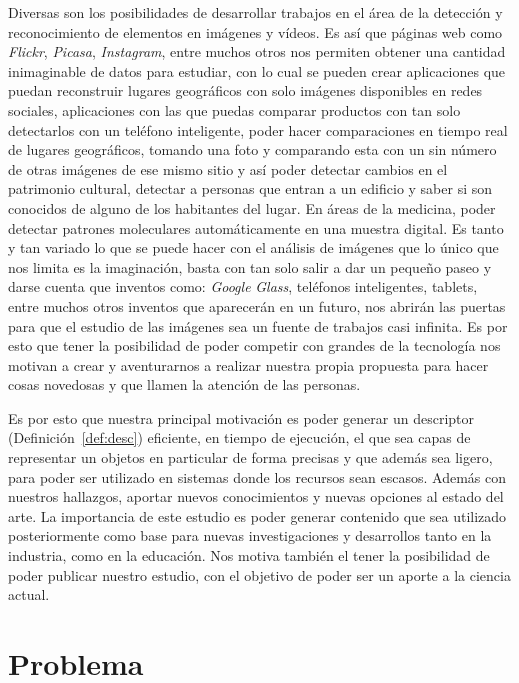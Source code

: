 Diversas son los posibilidades de desarrollar trabajos en el área de la detección y reconocimiento de elementos en imágenes y vídeos. Es así que páginas web como \textit{Flickr}, \textit{Picasa}, \textit{Instagram}, entre muchos otros nos permiten obtener una cantidad inimaginable de datos para estudiar, con lo cual se pueden crear aplicaciones que puedan reconstruir lugares geográficos con solo imágenes disponibles en redes sociales, aplicaciones con las que puedas comparar productos con tan solo detectarlos con un teléfono inteligente, poder hacer comparaciones en tiempo real de lugares geográficos, tomando una foto y comparando esta con un sin número de otras imágenes de ese mismo sitio y así poder detectar cambios en el patrimonio cultural, detectar a personas que entran a un edificio y saber si son conocidos de alguno de los habitantes del lugar. En áreas de la medicina, poder detectar patrones moleculares automáticamente en una muestra digital. Es tanto y tan variado lo que se puede hacer con el análisis de imágenes que lo único que nos limita es la imaginación, basta con tan solo salir a dar un pequeño paseo y darse cuenta que inventos como: \textit{Google} \textit{Glass}, teléfonos inteligentes, tablets, entre muchos otros inventos que aparecerán en un futuro, nos abrirán las puertas para que el estudio de las imágenes sea un fuente de trabajos casi infinita. Es por esto que tener la posibilidad de poder competir con grandes de la tecnología nos motivan a crear y aventurarnos a realizar nuestra propia propuesta para hacer cosas novedosas y que llamen la atención de las personas.

Es por esto que nuestra principal motivación es poder generar un descriptor (Definición~\ref{def:desc}) eficiente, en tiempo de ejecución, el que sea capas de representar un objetos en particular de forma precisas y que además sea ligero, para poder ser utilizado en sistemas donde los recursos sean escasos. Además con nuestros hallazgos, aportar nuevos conocimientos y nuevas opciones al estado del arte. La importancia de este estudio es poder generar contenido que sea utilizado posteriormente como base para nuevas investigaciones y desarrollos tanto en la industria, como en la educación. Nos motiva también el tener la posibilidad de poder publicar nuestro estudio, con el objetivo de poder ser un aporte a la ciencia actual.

\section{Problema}\label{sec:problema}

